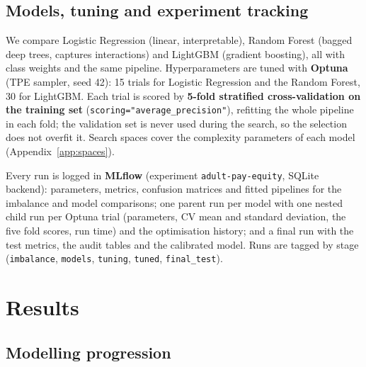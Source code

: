 \documentclass[11pt,a4paper]{article}
\begin{document}
\subsection{Models, tuning and experiment tracking}

We compare Logistic Regression (linear, interpretable), Random Forest (bagged deep trees, captures interactions) and LightGBM (gradient boosting), all with class weights and the same pipeline. Hyperparameters are tuned with \textbf{Optuna} (TPE sampler, seed 42): 15 trials for Logistic Regression and the Random Forest, 30 for LightGBM. Each trial is scored by \textbf{5-fold stratified cross-validation on the training set} (\texttt{scoring="average\_precision"}), refitting the whole pipeline in each fold; the validation set is never used during the search, so the selection does not overfit it. Search spaces cover the complexity parameters of each model (Appendix~\ref{app:spaces}).

Every run is logged in \textbf{MLflow} (experiment \texttt{adult-pay-equity}, SQLite backend): parameters, metrics, confusion matrices and fitted pipelines for the imbalance and model comparisons; one parent run per model with one nested child run per Optuna trial (parameters, CV mean and standard deviation, the five fold scores, run time) and the optimisation history; and a final run with the test metrics, the audit tables and the calibrated model. Runs are tagged by stage (\texttt{imbalance}, \texttt{models}, \texttt{tuning}, \texttt{tuned}, \texttt{final\_test}).

\section{Results}

\subsection{Modelling progression}
\end{document}
